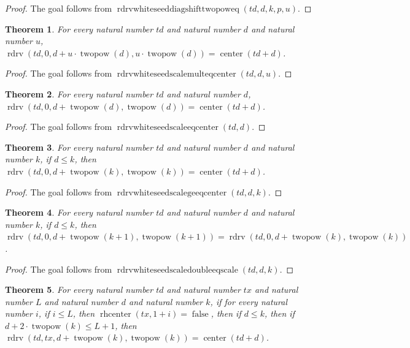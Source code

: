 \documentclass[11pt]{article}
\newtheorem{theorem}{Theorem}[section]
\theoremstyle{definition}
\begin{document}
\begin{proof}
The goal follows from \(\operatorname{rdrvwhiteseeddiagshifttwopoweq}(td, d, k, p, u)\).
\end{proof}
\begin{theorem}
\label{ll:paper:rdrv-white-seed-scale-mult-eq-center}
For every natural number \(td\) and natural number \(d\) and natural number \(u\), \(\operatorname{rdrv}(td, 0, d + u \cdot \operatorname{twopow}(d), u \cdot \operatorname{twopow}(d)) = \operatorname{center}(td + d)\).
\end{theorem}
\begin{proof}
The goal follows from \(\operatorname{rdrvwhiteseedscalemulteqcenter}(td, d, u)\).
\end{proof}
\begin{theorem}
\label{ll:paper:rdrv-white-seed-scale-eq-center}
For every natural number \(td\) and natural number \(d\), \(\operatorname{rdrv}(td, 0, d + \operatorname{twopow}(d), \operatorname{twopow}(d)) = \operatorname{center}(td + d)\).
\end{theorem}
\begin{proof}
The goal follows from \(\operatorname{rdrvwhiteseedscaleeqcenter}(td, d)\).
\end{proof}
\begin{theorem}
\label{ll:paper:rdrv-white-seed-scale-ge-eq-center}
For every natural number \(td\) and natural number \(d\) and natural number \(k\), if \(d \le k\), then \(\operatorname{rdrv}(td, 0, d + \operatorname{twopow}(k), \operatorname{twopow}(k)) = \operatorname{center}(td + d)\).
\end{theorem}
\begin{proof}
The goal follows from \(\operatorname{rdrvwhiteseedscalegeeqcenter}(td, d, k)\).
\end{proof}
\begin{theorem}
\label{ll:paper:rdrv-white-seed-scale-double-eq-scale}
For every natural number \(td\) and natural number \(d\) and natural number \(k\), if \(d \le k\), then \(\operatorname{rdrv}(td, 0, d + \operatorname{twopow}(k + 1), \operatorname{twopow}(k + 1)) = \operatorname{rdrv}(td, 0, d + \operatorname{twopow}(k), \operatorname{twopow}(k))\).
\end{theorem}
\begin{proof}
The goal follows from \(\operatorname{rdrvwhiteseedscaledoubleeqscale}(td, d, k)\).
\end{proof}
\begin{theorem}
\label{ll:paper:rdrv-scale-eq-center-of-initial-white-band}
For every natural number \(td\) and natural number \(tx\) and natural number \(L\) and natural number \(d\) and natural number \(k\), if for every natural number \(i\), if \(i \le L\), then \(\operatorname{rhcenter}(tx, 1 + i) = \operatorname{false}\), then if \(d \le k\), then if \(d + 2 \cdot \operatorname{twopow}(k) \le L + 1\), then \(\operatorname{rdrv}(td, tx, d + \operatorname{twopow}(k), \operatorname{twopow}(k)) = \operatorname{center}(td + d)\).
\end{theorem}
\end{document}
